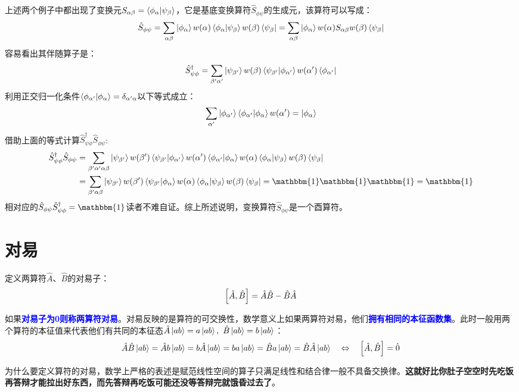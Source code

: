 上述两个例子中都出现了变换元$S_{\alpha\beta}=\bra{\phi_{\alpha}}\ket{\psi_{\beta}}$，它是基底变换算符$\hat{S}_{\phi\psi}$的生成元，该算符可以写成：
\[\hat{S}_{\phi\psi}=\sum_{\alpha\beta}\ket{\phi_{\alpha}}w(\alpha)\bra{\phi_{\alpha}}\ket{\psi_{\beta}}w(\beta)\bra{\psi_{\beta}}=\sum_{\alpha\beta}\ket{\phi_{\alpha}}w(\alpha)S_{\alpha\beta}w(\beta)\bra{\psi_{\beta}}\]
容易看出其伴随算子是：
\[\hat{S}_{\psi\phi}^{\dagger}=\sum_{\beta'\alpha'}\ket{\psi_{\beta'}}w(\beta)\bra{\psi_{\beta'}}\ket{\phi_{\alpha'}}w(\alpha')\bra{\phi_{\alpha'}}\]
利用正交归一化条件$\bra{\phi_{\alpha'}}\ket{\phi_{\alpha}}=\delta_{\alpha'\alpha}$以下等式成立：
\[\sum_{\alpha'}\ket{\phi_{\alpha'}}\bra{\phi_{\alpha'}}\ket{\phi_{\alpha}}w(\alpha')=\ket{\phi_{\alpha}}\]
借助上面的等式计算$\hat{S}_{\psi\phi}^{\dagger}\hat{S}_{\phi\psi}$:
\[\begin{aligned}
\hat{S}_{\psi\phi}^{\dagger}\hat{S}_{\phi\psi}&=\sum_{\beta'\alpha'\alpha\beta}\ket{\psi_{\beta'}}w(\beta')\bra{\psi_{\beta'}}\ket{\phi_{\alpha'}}w(\alpha')\bra{\phi_{\alpha'}}\ket{\phi_{\alpha}}w(\alpha)\bra{\phi_{\alpha}}\ket{\psi_{\beta}}w(\beta)\bra{\psi_{\beta}}\\&=\sum_{\beta'\alpha\beta}\ket{\psi_{\beta'}}w(\beta')\bra{\psi_{\beta'}}\ket{\phi_{\alpha}}w(\alpha)\bra{\phi_{\alpha}}\ket{\psi_{\beta}}w(\beta)\bra{\psi_{\beta}}=\mathbbm{1}\mathbbm{1}\mathbbm{1}=\mathbbm{1}
\end{aligned}\]
相对应的$\hat{S}_{\phi\psi}\hat{S}_{\psi\phi}^{\dagger}=\mathbbm{1}$读者不难自证。综上所述说明，变换算符$\hat{S}_{\phi\psi}$是一个酉算符。

\section{对易}
定义两算符$\hat{A}$、$\hat{B}$的对易子：
\[\comm{\hat{A}}{\hat{B}}=\hat{A}\hat{B}-\hat{B}\hat{A}\]

如果\textcolor{blue}{\textbf{对易子为0则称两算符对易}}。对易反映的是算符的可交换性，数学意义上如果两算符对易，他们\textcolor{blue}{\textbf{拥有相同的本征函数集}}。此时一般用两个算符的本征值来代表他们有共同的本征态$\hat{A}\ket{ab}=a\ket{ab}, \ \hat{B}\ket{ab}=b\ket{ab}$：
\[\hat{A}\hat{B}\ket{ab}=\hat{A}b\ket{ab}=b\hat{A}\ket{ab}=ba\ket{ab}=\hat{B}a\ket{ab}=\hat{B}\hat{A}\ket{ab} \quad \Leftrightarrow \quad \comm{\hat{A}}{\hat{B}}=\hat{0}\]

为什么要定义算符的对易，数学上严格的表述是赋范线性空间的算子只满足线性和结合律一般不具备交换律。\textbf{这就好比你肚子空空时先吃饭再答辩才能拉出好东西，而先答辩再吃饭可能还没等答辩完就饿昏过去了}。

